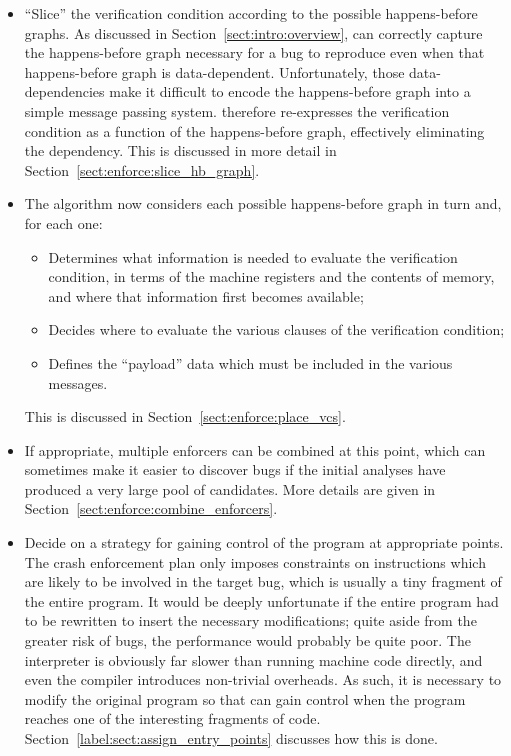 \begin{itemize}
\item
  ``Slice'' the verification condition according to the possible
  happens-before graphs. As discussed in
  Section~\ref{sect:intro:overview}, {\technique} can correctly
  capture the happens-before graph necessary for a bug to reproduce
  even when that happens-before graph is data-dependent.
  Unfortunately, those data-dependencies make it difficult to encode
  the happens-before graph into a simple message passing system.
  {\Technique} therefore re-expresses the verification condition as a
  function of the happens-before graph, effectively eliminating the
  dependency.  This is discussed in more detail in
  Section~\ref{sect:enforce:slice_hb_graph}.
\item
  The algorithm now considers each possible happens-before graph in
  turn and, for each one:

  \begin{itemize}
  \item
    Determines what information is needed to evaluate the verification
    condition, in terms of the machine registers and the contents of
    memory, and where that information first becomes available;
  \item
    Decides where to evaluate the various clauses of the verification
    condition;
  \item
    Defines the ``payload'' data which must be included in the various
    messages.
  \end{itemize}

  This is discussed in Section~\ref{sect:enforce:place_vcs}.
\item
  If appropriate, multiple enforcers can be combined at this point,
  which can sometimes make it easier to discover bugs if the initial
  analyses have produced a very large pool of candidates.  More
  details are given in Section~\ref{sect:enforce:combine_enforcers}.
\item
  Decide on a strategy for gaining control of the program at
  appropriate points.  The crash enforcement plan only imposes
  constraints on instructions which are likely to be involved in the
  target bug, which is usually a tiny fragment of the entire program.
  It would be deeply unfortunate if the entire program had to be
  rewritten to insert the necessary modifications; quite aside from
  the greater risk of bugs, the performance would probably be quite
  poor.  The interpreter is obviously far slower than running machine
  code directly, and even the compiler introduces non-trivial
  overheads.  As such, it is necessary to modify the original program
  so that {\technique} can gain control when the program reaches one
  of the interesting fragments of code.
  Section~\ref{label:sect:assign_entry_points} discusses how this is
  done.


\end{itemize}
